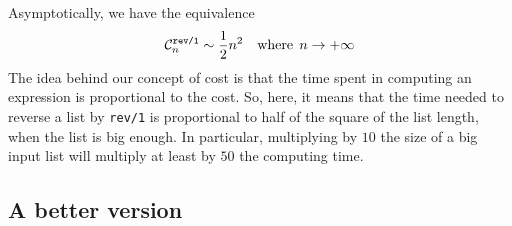 \documentclass[11pt,a4paper]{article}
\newcommand\stt[1]{\texttt{\small #1}}
\newcommand\comp[2]{{\cal C}_{#2}^{\texttt{#1}}}
\begin{document}
\medskip

\noindent Asymptotically, we have the equivalence
\[
\comp{rev/1}{n} \sim \frac{1}{2}{n^2} \quad \text{where} \;\, n
\rightarrow +\infty
\]
\noindent The idea behind our concept of cost is that the time spent
in computing an expression is proportional to the cost. So, here, it
means that the time needed to reverse a list by \stt{rev/1} is
proportional to half of the square of the list length, when the list
is big enough. In particular, multiplying by \(10\) the size of a big
input list will multiply at least by \(50\) the computing time.

\subsection{A better version}
\end{document}
